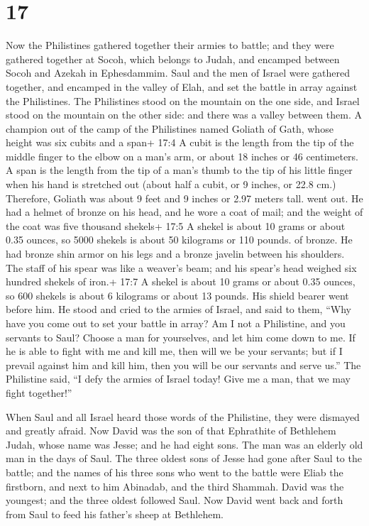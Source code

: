 \hypertarget{section-16}{%
\section{17}\label{section-16}}

 Now the Philistines gathered together their armies to
battle; and they were gathered together at Socoh, which belongs to
Judah, and encamped between Socoh and Azekah in Ephesdammim.
 Saul and the men of Israel were gathered together, and
encamped in the valley of Elah, and set the battle in array against the
Philistines.  The Philistines stood on the mountain on the
one side, and Israel stood on the mountain on the other side: and there
was a valley between them.  A champion out of the camp of
the Philistines named Goliath of Gath, whose height was six cubits and a
span+ 17:4 A cubit is the length from the tip of the middle finger to
the elbow on a man's arm, or about 18 inches or 46 centimeters. A span
is the length from the tip of a man's thumb to the tip of his little
finger when his hand is stretched out (about half a cubit, or 9 inches,
or 22.8 cm.) Therefore, Goliath was about 9 feet and 9 inches or 2.97
meters tall. went out.  He had a helmet of bronze on his
head, and he wore a coat of mail; and the weight of the coat was five
thousand shekels+ 17:5 A shekel is about 10 grams or about 0.35 ounces,
so 5000 shekels is about 50 kilograms or 110 pounds. of bronze.
 He had bronze shin armor on his legs and a bronze javelin
between his shoulders.  The staff of his spear was like a
weaver's beam; and his spear's head weighed six hundred shekels of
iron.+ 17:7 A shekel is about 10 grams or about 0.35 ounces, so 600
shekels is about 6 kilograms or about 13 pounds. His shield bearer went
before him.  He stood and cried to the armies of Israel, and
said to them, ``Why have you come out to set your battle in array? Am I
not a Philistine, and you servants to Saul? Choose a man for yourselves,
and let him come down to me.  If he is able to fight with me
and kill me, then will we be your servants; but if I prevail against him
and kill him, then you will be our servants and serve us.''
 The Philistine said, ``I defy the armies of Israel today!
Give me a man, that we may fight together!''

 When Saul and all Israel heard those words of the
Philistine, they were dismayed and greatly afraid.  Now
David was the son of that Ephrathite of Bethlehem Judah, whose name was
Jesse; and he had eight sons. The man was an elderly old man in the days
of Saul.  The three oldest sons of Jesse had gone after
Saul to the battle; and the names of his three sons who went to the
battle were Eliab the firstborn, and next to him Abinadab, and the third
Shammah.  David was the youngest; and the three oldest
followed Saul.  Now David went back and forth from Saul to
feed his father's sheep at Bethlehem.

